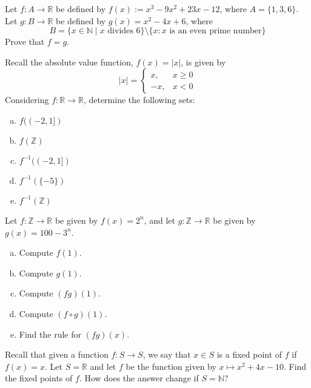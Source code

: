 \documentclass[11pt,letterpaper]{article}
\begin{document}
\homework{}

 Let $f: A \to \mathbb{R}$ be defined by $f(x):= x^3 - 9x^2 + 23x - 12$, where $A= \{ 1, 3, 6 \}$. Let $g: B \to \mathbb{R}$ be defined by $g(x)= x^2 - 4x + 6$, where 
	\[
	B= \{ x \in \mathbb{N} \;|\; x \text{ divides }6 \} \setminus \{x \colon x \text{ is an even prime number} \}
	\]
Prove that $f= g$. 





\newpage





 Recall the absolute value function, $f(x)= |x|$, is given by
	\[
	|x|= 
	\begin{cases}
	x, & x \geq 0 \\
	-x, & x < 0 
	\end{cases}
	\]
Considering $f: \mathbb{R} \to \mathbb{R}$, determine the following sets:
\begin{enumerate}[(a)]
\item $f((-2, 1])$
\item $f(\mathbb{Z})$
\item $f^{-1}((-2,1])$
\item $f^{-1}(\{-5\})$
\item $f^{-1}(\mathbb{Z})$
\end{enumerate}





\newpage





 Let $f: \mathbb{Z} \to \mathbb{R}$ be given by $f(x)= 2^n$, and let $g: \mathbb{Z} \to \mathbb{R}$ be given by $g(x)= 100 - 3^n$. 
\begin{enumerate}[(a)]
\item Compute $f(1)$.
\item Compute $g(1)$.
\item Compute $(fg)(1)$.
\item Compute $(f \circ g)(1)$.
\item Find the rule for $(fg)(x)$.
\end{enumerate}





\newpage





 Recall that given a function $f: S \to S$, we say that $x \in S$ is a fixed point of $f$ if $f(x)= x$. Let $S= \mathbb{R}$ and let $f$ be the function given by $x \mapsto x^2 + 4x - 10$. Find the fixed points of $f$. How does the answer change if $S= \mathbb{N}$? 
\end{document}
